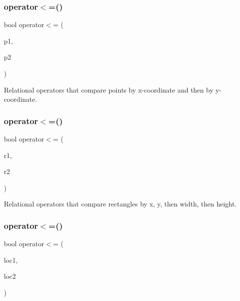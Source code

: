 \subsubsection{\texorpdfstring{operator$<$=()}{operator<=()}\hspace{0.1cm}{\footnotesize\ttfamily [2/4]}}
{\footnotesize\ttfamily bool operator$<$= (\begin{DoxyParamCaption}\item[{const \mbox{\hyperlink{structsgl_1_1GPoint}{G\+Point}} \&}]{p1,  }\item[{const \mbox{\hyperlink{structsgl_1_1GPoint}{G\+Point}} \&}]{p2 }\end{DoxyParamCaption})}



Relational operators that compare points by x-\/coordinate and then by y-\/coordinate. 

\mbox{\label{namespacesgl_a3588a1e1157026c5ef8c0ed41ba78890}} 
\subsubsection{\texorpdfstring{operator$<$=()}{operator<=()}\hspace{0.1cm}{\footnotesize\ttfamily [3/4]}}
{\footnotesize\ttfamily bool operator$<$= (\begin{DoxyParamCaption}\item[{const \mbox{\hyperlink{structsgl_1_1GRectangle}{G\+Rectangle}} \&}]{r1,  }\item[{const \mbox{\hyperlink{structsgl_1_1GRectangle}{G\+Rectangle}} \&}]{r2 }\end{DoxyParamCaption})}



Relational operators that compare rectangles by x, y, then width, then height. 

\mbox{\label{namespacesgl_af99f33328a3668180d4930677e24f0bd}} 
\subsubsection{\texorpdfstring{operator$<$=()}{operator<=()}\hspace{0.1cm}{\footnotesize\ttfamily [4/4]}}
{\footnotesize\ttfamily bool operator$<$= (\begin{DoxyParamCaption}\item[{const \mbox{\hyperlink{structsgl_1_1GTableIndex}{G\+Table\+Index}} \&}]{loc1,  }\item[{const \mbox{\hyperlink{structsgl_1_1GTableIndex}{G\+Table\+Index}} \&}]{loc2 }\end{DoxyParamCaption})}


